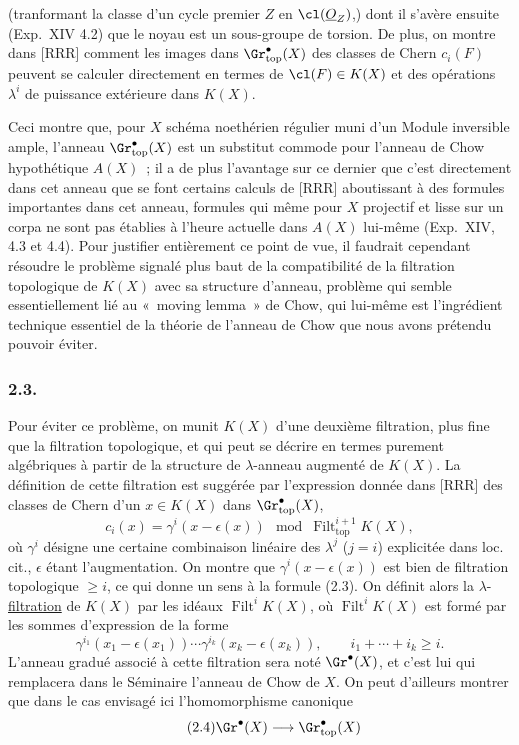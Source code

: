 (tranformant la classe d'un cycle premier $Z$ en $\cl(\underline O_Z)$,) dont il s'avère ensuite (Exp.\ XIV 4.2) que le noyau est un sous-groupe de torsion. De plus, on montre dans [RRR] comment les images dans $\Gr^{\bullet}_{\mathrm{top}}(X)$ des classes de Chern $c_i(F)$ peuvent se calculer directement en termes de $\cl(F)\in K(X)$ et des opérations $\lambda^i$ de puissance extérieure dans $K(X)$.

Ceci montre que, pour $X$ schéma noethérien régulier muni d'un Module inversible ample, l'anneau $\Gr^{\bullet}_{\mathrm{top}}(X)$ est un substitut commode pour l'anneau de Chow hypothétique $A(X)$~; il a de plus l'avantage sur ce dernier que c'est directement dans cet anneau que se font certains calculs de [RRR] aboutissant à des formules importantes dans cet anneau, formules qui même pour $X$ projectif et lisse sur un corpa ne sont pas établies à l'heure actuelle dans $A(X)$ lui-même (Exp.\ XIV, 4.3 et 4.4). Pour justifier entièrement ce point de vue, il faudrait cependant résoudre le problème signalé plus baut de la compatibilité de la filtration topologique de $K(X)$ avec sa structure d'anneau, problème qui semble essentiellement lié au «~moving lemma~» de Chow, qui lui-même est l'ingrédient technique essentiel de la théorie de l'anneau de Chow que nous avons prétendu pouvoir éviter.

\subsubsection*{2.3.}
Pour éviter ce problème, on munit $K(X)$ d'une deuxième filtration, plus fine que la filtration topologique, et qui peut se décrire en termes purement algébriques à partir de la structure de $\lambda$-anneau augmenté de $K(X)$. La définition de cette filtration est suggérée par l'expression donnée dans [RRR] des classes de Chern d'un $x\in K(X)$ dans $\Gr^{\bullet}_{\mathrm{top}}(X)$,
\begin{equation}\tag{2.3}
c_i(x)=\gamma^i(x-\epsilon(x))\mod \operatorname{Filt}^{i+1}_{\mathrm{top}}K(X),
\end{equation}
où $\gamma^i$ désigne une certaine combinaison linéaire des $\lambda^j$ ($j=i$) explicitée dans loc. cit., $\epsilon$ étant l'augmentation. On montre que $\gamma^i(x-\epsilon(x))$ est bien de filtration topologique $\ge i$, ce qui donne un sens à la formule (2.3). On définit alors la $\lambda$-\underline{filtration} de $K(X)$ par les idéaux $\operatorname{Filt}^i K(X)$, où $\operatorname{Filt}^i K(X)$ est formé par les sommes d'expression de la forme
\[
\gamma^{i_1}(x_1-\epsilon(x_1))\cdots \gamma^{i_k}(x_k-\epsilon(x_k)),\qquad i_1+\cdots+i_k\ge i.
\]
L'anneau gradué associé à cette filtration sera noté $\Gr^\bullet(X)$, et c'est lui qui remplacera dans le Séminaire l'anneau de Chow de $X$. On peut d'ailleurs montrer que dans le cas envisagé ici l'homomorphisme canonique
\begin{equation}\tag{2.4}
\Gr^\bullet(X)\longrightarrow \Gr^{\bullet}_{\mathrm{top}}(X)
\end{equation}
